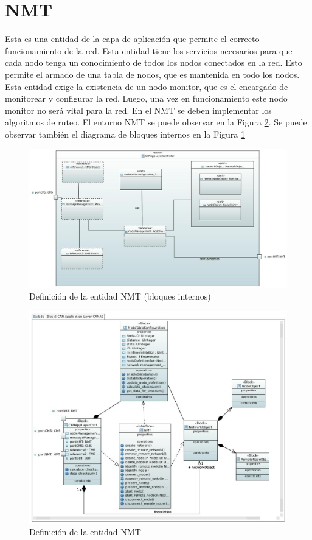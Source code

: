 \section{NMT}\label{Appendix:NMT}
Esta es una entidad de la capa de aplicación que permite el correcto
funcionamiento de la red. Esta entidad tiene los servicios necesarios para que
cada nodo tenga un conocimiento de todos los nodos conectados en la red. Esto
permite el armado de una tabla de nodos, que es mantenida en todo los
nodos. Esta entidad exige la existencia de un nodo monitor, que es el encargado
de monitorear y configurar la red. Luego, una vez en funcionamiento este nodo
monitor no será vital para la red. En el NMT se deben implementar los
algoritmos de ruteo. El entorno NMT se puede observar en la Figura
\ref{fig:NMT}. Se puede observar también el diagrama de bloques internos en
la Figura \ref{fig:NMTInterno}

\begin{figure}[h!]
 \centering
 \includegraphics[scale=0.4]{images/Secciones/AppendixA/CANae_Application_Layer_Controller.JPG}
  \caption{Definición de la entidad NMT (bloques internos)}
\label{fig:NMTInterno}
\end{figure} 

\begin{figure}[h!]
 \centering
 \includegraphics[scale=0.4]{images/Secciones/AppendixA/NMT.JPG}
  \caption{Definición de la entidad NMT}
\label{fig:NMT}
\end{figure} 

